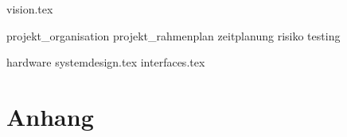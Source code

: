 \documentclass[a4paper, 10pt, fleqn]{article}
\begin{document}
	\begin{titlepage}
		\titleGM
		\thispagestyle{empty}
	\end{titlepage}
	
	\tableofcontents
	
    \clearpage
    
	\clearpage
	
    
    {vision.tex}
    
    {projekt_organisation}
    \clearpage
    {projekt_rahmenplan}
    \clearpage
    {zeitplanung}
    \clearpage
    {risiko}
    \clearpage
    {testing}
    
    {hardware}
    \clearpage
	{systemdesign.tex}
    \clearpage
    {interfaces.tex}
    
    \clearpage
    
    
    \nocite{*}
    
    
    
    \listoffigures
    \listoftables
    
    \clearpage
    \thispagestyle{empty}
    	\section*{Anhang}
\end{document}
